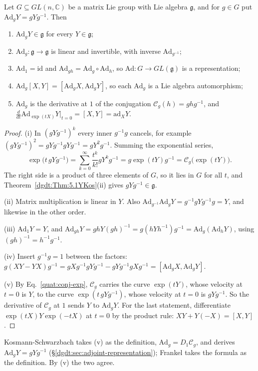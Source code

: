 \begin{proposition}\label{quat:prop:Ad}
Let $G\subseteq GL(n,\mathbb C)$ be a matrix Lie group with Lie algebra
$\mathfrak g$, and for $g\in G$ put $\mathrm{Ad}_gY=gYg^{-1}$. Then
\begin{enumerate}
 \item[(i)] $\mathrm{Ad}_gY\in\mathfrak g$ for every $Y\in\mathfrak g$;
 \item[(ii)] $\mathrm{Ad}_g\colon\mathfrak g\to\mathfrak g$ is linear and
  invertible, with inverse $\mathrm{Ad}_{g^{-1}}$;
 \item[(iii)] $\mathrm{Ad}_1=\mathrm{id}$ and
  $\mathrm{Ad}_{gh}=\mathrm{Ad}_g\circ\mathrm{Ad}_h$, so
  $\mathrm{Ad}\colon G\to GL(\mathfrak g)$ is a representation;
 \item[(iv)] $\mathrm{Ad}_g[X,Y]=[\mathrm{Ad}_gX,\mathrm{Ad}_gY]$, so each
  $\mathrm{Ad}_g$ is a Lie algebra automorphism;
 \item[(v)] $\mathrm{Ad}_g$ is the derivative at $1$ of the conjugation
  $\mathcal C_g(h)=ghg^{-1}$, and
  $\frac{d}{dt}\mathrm{Ad}_{\exp(tX)}Y\big|_{t=0}=[X,Y]=\mathrm{ad}_XY$.
\end{enumerate}
\end{proposition}
\begin{proof}
(i) In $(gYg^{-1})^k$ every inner $g^{-1}g$ cancels, for example
$(gYg^{-1})^2=gYg^{-1}gYg^{-1}=gY^2g^{-1}$. Summing the exponential series,
\begin{equation}\label{quat:conj-exp}
 \exp\bigl(t\,gYg^{-1}\bigr)=\sum_{k=0}^{\infty}\frac{t^k}{k!}gY^kg^{-1}
 =g\exp(tY)g^{-1}=\mathcal C_g\bigl(\exp(tY)\bigr).
\end{equation}
The right side is a product of three elements of $G$, so it lies in $G$
for all $t$, and Theorem~\ref{dgdt:Thm:5.1YKos}(ii) gives
$gYg^{-1}\in\mathfrak g$.

(ii) Matrix multiplication is linear in $Y$. Also
$\mathrm{Ad}_{g^{-1}}\mathrm{Ad}_gY=g^{-1}gYg^{-1}g=Y$, and likewise in the
other order.

(iii) $\mathrm{Ad}_1Y=Y$, and
$\mathrm{Ad}_{gh}Y=ghY(gh)^{-1}=g(hYh^{-1})g^{-1}=\mathrm{Ad}_g(\mathrm{Ad}_hY)$,
using $(gh)^{-1}=h^{-1}g^{-1}$.

(iv) Insert $g^{-1}g=1$ between the factors:
$g(XY-YX)g^{-1}=gXg^{-1}gYg^{-1}-gYg^{-1}gXg^{-1}
=[\mathrm{Ad}_gX,\mathrm{Ad}_gY]$.

(v) By Eq.~\eqref{quat:conj-exp}, $\mathcal C_g$ carries the curve
$\exp(tY)$, whose velocity at $t=0$ is $Y$, to the curve
$\exp(t\,gYg^{-1})$, whose velocity at $t=0$ is $gYg^{-1}$. So the derivative
of $\mathcal C_g$ at $1$ sends $Y$ to $\mathrm{Ad}_gY$. For the last
statement, differentiate $\exp(tX)Y\exp(-tX)$ at $t=0$ by the product rule:
$XY+Y(-X)=[X,Y]$.
\end{proof}
Kosmann-Schwarzbach takes (v) as the definition, $\mathrm{Ad}_g=D_1\mathcal
C_g$, and derives $\mathrm{Ad}_gY=gYg^{-1}$
(\S\ref{dgdt:sec:adjoint-representation}); Frankel takes the formula as the
definition. By (v) the two agree.

